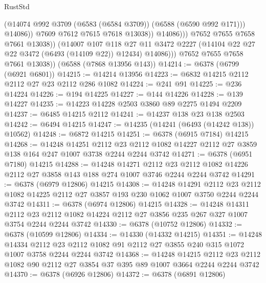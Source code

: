 \begin{lexlean}{RustStd}
\begin{coremodule}
                              (@14074 @992 @3709 (@6583 (@6584 @3709)) (@6588 (@6590 @992 @171)))
                              @14086))
                          @7609
                          @7612
                          @7615
                          @7618
                          @13038))
                      @14086)))
                @7652
                @7655
                @7658
                @7661
                @13038))
            (@14007
              @107
              @118
              @27
              @11
              @3472
              @2227
              (@14104 @22 @27 @22 @3472 (@6493 (@14109 @22)) @12434)
              @14086)))
        @7652
        @7655
        @7658
        @7661
        @13038))
    (@6588 (@7868 @13956 @143))
@14214 := @6378 (@6799 (@6921 @6801))
@14215 := @14214 @13956
@14223 := @6832 @14215 @2112 @2112 @27 @23 @2112 @286 @1082
@14224 := @241 @91
@14225 := @236 @14224
@14226 := @194 @14225
@14227 := @144 @14226
@14228 := @139 @14227
@14235 := @14223 @14228 @2503 @3860 @89 @2275 @1494 @2209
@14237 := @6485 @14215 @2112
@14241 := @14237 @138 @23 @138 @2503
@14242 := @6494 @14215
@14247 := @14235 (@14241 (@6493 (@14242 @138)) @10562)
@14248 := @6872 @14215
@14251 := @6378 (@6915 @7184) @14215
@14268 := @14248
    @14251
    @2112
    @23
    @2112
    @1082
    @14227
    @2112
    @27
    @3859
    @138
    @164
    @247
    @1007
    @3738
    @2244
    @2244
    @3742
@14271 := @6378 (@6951 @7180) @14215
@14288 := @14248
    @14271
    @2112
    @23
    @2112
    @1082
    @14226
    @2112
    @27
    @3858
    @143
    @188
    @274
    @1007
    @3746
    @2244
    @2244
    @3742
@14291 := @6378 (@6979 @12806) @14215
@14308 := @14248
    @14291
    @2112
    @23
    @2112
    @1082
    @14225
    @2112
    @27
    @3857
    @193
    @230
    @1062
    @1007
    @3750
    @2244
    @2244
    @3742
@14311 := @6378 (@6974 @12806) @14215
@14328 := @14248
    @14311
    @2112
    @23
    @2112
    @1082
    @14224
    @2112
    @27
    @3856
    @235
    @267
    @327
    @1007
    @3754
    @2244
    @2244
    @3742
@14330 := @6378 (@10752 @12806)
@14332 := @6378 (@10599 @12806)
@14334 := @14330 (@14332 @14215)
@14351 := @14248
    @14334
    @2112
    @23
    @2112
    @1082
    @91
    @2112
    @27
    @3855
    @240
    @315
    @1072
    @1007
    @3758
    @2244
    @2244
    @3742
@14368 := @14248
    @14215
    @2112
    @23
    @2112
    @1082
    @90
    @2112
    @27
    @3854
    @37
    @395
    @89
    @1007
    @3664
    @2244
    @2244
    @3742
@14370 := @6378 (@6926 @12806)
@14372 := @6378 (@6891 @12806)

\end{coremodule}
\end{lexlean}
